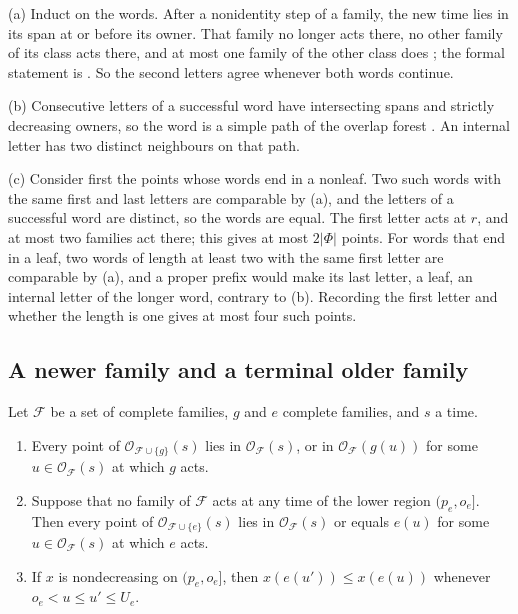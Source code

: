 \begin{outline}
(a) Induct on the words. After a nonidentity step of a family, the new time lies in
its span at or before its owner. That family no longer acts there, no other family of
its class acts there, and at most one family of the other class does
\cite[proof of Lemma~2.6]{SourceCovers2026}; the formal statement is
. So the second letters agree whenever both words
continue.

(b) Consecutive letters of a successful word have intersecting spans and strictly
decreasing owners, so the word is a simple path of the overlap forest
\cite[Lemma~2.6]{SourceCovers2026}. An internal letter has two distinct neighbours on
that path.

(c) Consider first the points whose words end in a nonleaf. Two such words with the
same first and last letters are comparable by (a), and the letters of a successful word
are distinct, so the words are equal. The first letter acts at $r$, and at most two
families act there; this gives at most $2|\Phi|$ points. For words that end in a leaf,
two words of length at least two with the same first letter are comparable by (a), and
a proper prefix would make its last letter, a leaf, an internal letter of the longer
word, contrary to (b). Recording the first letter and whether the length is one gives
at most four such points.
\end{outline}

\subsection{A newer family and a terminal older family}

\begin{lemma}\label{lem:landing-orbits}
Let $\mathcal F$ be a set of complete families, $g$ and $e$ complete families, and $s$ a
time.
\begin{enumerate}[label=(\alph*)]
\item Every point of $\mathcal O_{\mathcal F\cup\{g\}}(s)$ lies in
$\mathcal O_{\mathcal F}(s)$, or in $\mathcal O_{\mathcal F}(g(u))$ for some
$u\in\mathcal O_{\mathcal F}(s)$ at which $g$ acts.
\item Suppose that no family of $\mathcal F$ acts at any time of the lower region
$(p_e,o_e]$. Then every point of $\mathcal O_{\mathcal F\cup\{e\}}(s)$ lies in
$\mathcal O_{\mathcal F}(s)$ or equals $e(u)$ for some $u\in\mathcal O_{\mathcal F}(s)$
at which $e$ acts.
\item If $x$ is nondecreasing on $(p_e,o_e]$, then $x(e(u'))\le x(e(u))$ whenever
$o_e<u\le u'\le U_e$.
\end{enumerate}
\end{lemma}

